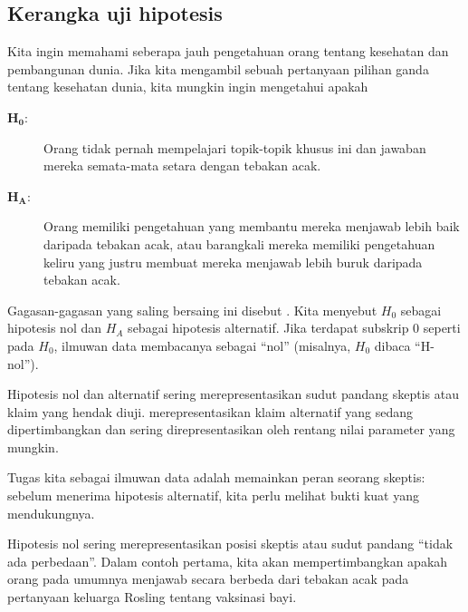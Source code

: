 

\subsection{Kerangka uji hipotesis}

Kita ingin memahami seberapa jauh pengetahuan orang
tentang kesehatan dan pembangunan dunia.
Jika kita mengambil sebuah pertanyaan pilihan ganda
tentang kesehatan dunia, kita mungkin ingin mengetahui apakah
\begin{description}
\item[$\mathbf{H_0}$:]
    Orang tidak pernah mempelajari topik-topik khusus ini dan
    jawaban mereka semata-mata setara dengan tebakan acak.
\item[$\mathbf{H_A}$:]
    Orang memiliki pengetahuan yang membantu mereka menjawab lebih baik
    daripada tebakan acak, atau barangkali mereka memiliki pengetahuan keliru
    yang justru membuat mereka menjawab lebih buruk daripada tebakan acak.
\end{description}
Gagasan-gagasan yang saling bersaing ini disebut .
Kita menyebut $H_0$ sebagai hipotesis nol dan $H_A$ sebagai hipotesis
alternatif.
Jika terdapat subskrip 0 seperti pada $H_0$,
ilmuwan data membacanya sebagai ``nol''
(misalnya, $H_0$ dibaca ``H-nol'').

\begin{onebox}{Hipotesis nol dan alternatif}
   sering merepresentasikan
  sudut pandang skeptis atau klaim yang hendak diuji.
   merepresentasikan
  klaim alternatif yang sedang dipertimbangkan dan sering
  direpresentasikan oleh rentang nilai parameter yang mungkin.
  \stdvspace{}
  
  Tugas kita sebagai ilmuwan data adalah memainkan peran seorang skeptis:
  sebelum menerima hipotesis alternatif, kita perlu
  melihat bukti kuat yang mendukungnya.
\end{onebox}

Hipotesis nol sering merepresentasikan posisi skeptis
atau sudut pandang ``tidak ada perbedaan''.
Dalam contoh pertama, kita akan mempertimbangkan apakah
orang pada umumnya menjawab secara berbeda dari tebakan acak
pada pertanyaan keluarga Rosling tentang vaksinasi bayi.

